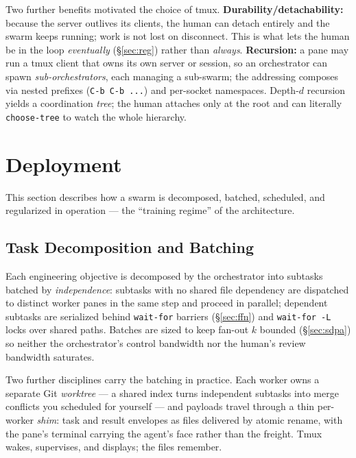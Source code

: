 \documentclass[10pt]{article}
\newcommand{\code}[1]{\texttt{\small #1}}
\begin{document}
Two further benefits motivated the choice of tmux. \textbf{Durability/detachability:}
because the server outlives its clients, the human can detach entirely and the swarm
keeps running; work is not lost on disconnect. This is what lets the human be in the
loop \emph{eventually} (\S\ref{sec:reg}) rather than \emph{always}. \textbf{Recursion:}
a pane may run a tmux client that owns its own server or session, so an orchestrator
can spawn \emph{sub-orchestrators}, each managing a sub-swarm; the addressing composes
via nested prefixes (\code{C-b C-b ...}) and per-socket namespaces. Depth-$d$ recursion
yields a coordination \emph{tree}; the human attaches only at the root and can literally
\code{choose-tree} to watch the whole hierarchy.

\section{Deployment}\label{sec:deploy}

This section describes how a swarm is decomposed, batched, scheduled, and regularized
in operation --- the ``training regime'' of the architecture.

\subsection{Task Decomposition and Batching}\label{sec:batching}

Each engineering objective is decomposed by the orchestrator into subtasks batched by
\emph{independence}: subtasks with no shared file dependency are dispatched to distinct
worker panes in the same step and proceed in parallel; dependent subtasks are
serialized behind \code{wait-for} barriers (\S\ref{sec:ffn}) and \code{wait-for -L}
locks over shared paths. Batches are sized to keep fan-out $k$ bounded
(\S\ref{sec:sdpa}) so neither the orchestrator's control bandwidth nor the human's
review bandwidth saturates.

Two further disciplines carry the batching in practice. Each worker owns a separate
Git \emph{worktree} --- a shared index turns independent subtasks into merge
conflicts you scheduled for yourself --- and payloads travel through a thin
per-worker \emph{shim}: task and result envelopes as files delivered by atomic
rename, with the pane's terminal carrying the agent's face rather than the freight.
Tmux wakes, supervises, and displays; the files remember.
\end{document}
